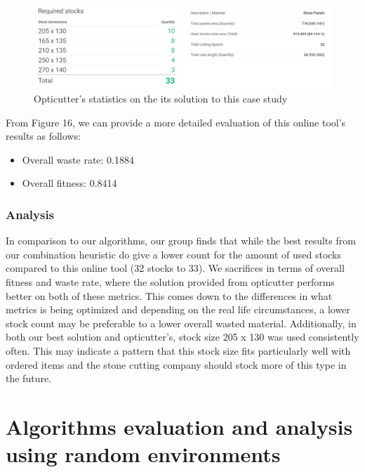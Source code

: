 \documentclass[a4paper]{article}
\begin{document}
    \begin{figure}[h]
        \centering
        \includegraphics[scale = 0.37]{Image/online_tool_result.png}
        \caption{Opticutter's statistics on the its solution to this case study}
    \end{figure}
    \noindent
    From Figure 16, we can provide a more detailed evaluation of this online tool's results as follows:
    \begin{itemize}
        \item Overall waste rate: 0.1884
        \item Overall fitness: 0.8414
    \end{itemize}
    \noindent
    \subsubsection{Analysis}
    In comparison to our algorithms, our group finds that while the best results from our combination heuristic do give a lower count for the amount of used stocks compared to this online tool (32 stocks to 33). We sacrifices in terms of overall fitness and waste rate, where the solution provided from opticutter performs better on both of these metrics. This comes down to the differences in what metrics is being optimized and depending on the real life circumstances, a lower stock count may be preferable to a lower overall wasted material.
    Additionally, in both our best solution and opticutter's, stock size 205 x 130 was used consistently often. This may indicate a pattern that this stock size fits particularly well with ordered items and the stone cutting company should stock more of this type in the future.  
    
    \pagebreak
    \section{Algorithms evaluation and analysis using random environments}
\end{document}
